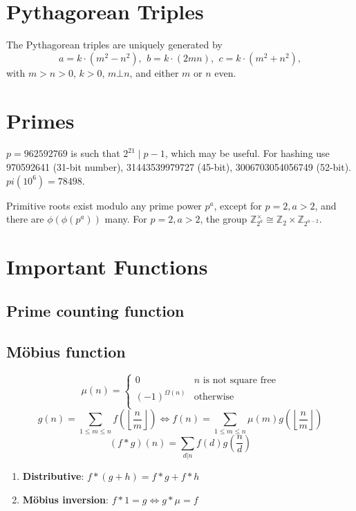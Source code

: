 \section{Pythagorean Triples}
 The Pythagorean triples are uniquely generated by
 \[ a=k\cdot (m^{2}-n^{2}),\ \,b=k\cdot (2mn),\ \,c=k\cdot (m^{2}+n^{2}), \]
 with $m > n > 0$, $k > 0$, $m \bot n$, and either $m$ or $n$ even.

\section{Primes}
	$p=962592769$ is such that $2^{21} \mid p-1$, which may be useful. For hashing
	use 970592641 (31-bit number), 31443539979727 (45-bit), 3006703054056749
	(52-bit). $pi(10^6) = 78498$.

	Primitive roots exist modulo any prime power $p^a$, except for $p = 2, a > 2$, and there are $\phi(\phi(p^a))$ many.
	For $p = 2, a > 2$, the group $\mathbb Z_{2^a}^\times \cong \mathbb Z_2 \times \mathbb Z_{2^{a-2}}$.



\section{Important Functions}
\subsection{Prime counting function}
\subsection{Möbius function}
\[
	\mu(n) = \begin{cases} 0 & n \textrm{ is not square free}\\ (-1)^{\Omega(n)} & \textrm{otherwise}\\\end{cases}
\]
 \[ g(n) = \sum_{1 \leq m \leq n} f\left(\left\lfloor\frac{n}{m}\right \rfloor \right) \Leftrightarrow f(n) = \sum_{1\leq m\leq n} \mu(m)g\left(\left\lfloor\frac{n}{m}\right\rfloor\right)\]
 \[(f*g)(n)= \sum_{d|n}f(d)g\left(\frac{n}{d}\right)\]
 \begin{enumerate}
	\item \textbf{Distributive}: $f*(g+h) = f*g + f*h$
	\item \textbf{Möbius inversion}: $f*1=g \iff g*\mu=f$
 \end{enumerate}

